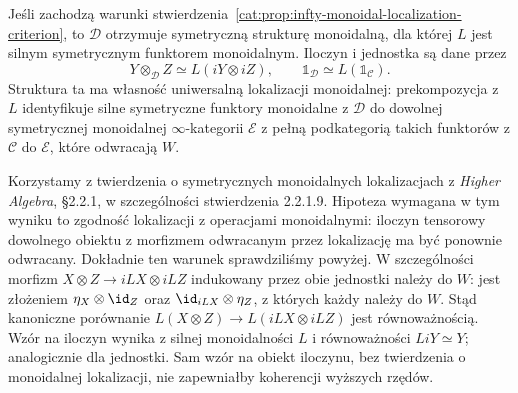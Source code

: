 \begin{twierdzenie}\label{cat:thm:infty-monoidal-localization}
Jeśli zachodzą warunki stwierdzenia~\ref{cat:prop:infty-monoidal-localization-criterion}, to $\mathcal D$ otrzymuje symetryczną strukturę monoidalną, dla której $L$ jest silnym symetrycznym funktorem monoidalnym. Iloczyn i jednostka są dane przez
\[
 Y\otimes_{\mathcal D} Z\simeq L(iY\otimes iZ),
 \qquad \mathbb 1_{\mathcal D}\simeq L(\mathbb 1_{\mathcal C}).
\]
Struktura ta ma własność uniwersalną lokalizacji monoidalnej: prekompozycja z $L$ identyfikuje silne symetryczne funktory monoidalne z $\mathcal D$ do dowolnej symetrycznej monoidalnej $\infty$-kategorii $\mathcal E$ z pełną podkategorią takich funktorów z $\mathcal C$ do $\mathcal E$, które odwracają $W$.
\end{twierdzenie}

Korzystamy z twierdzenia o symetrycznych monoidalnych lokalizacjach z \emph{Higher Algebra}, \S2.2.1, w szczególności stwierdzenia 2.2.1.9. Hipoteza wymagana w tym wyniku to zgodność lokalizacji z operacjami monoidalnymi: iloczyn tensorowy dowolnego obiektu z morfizmem odwracanym przez lokalizację ma być ponownie odwracany. Dokładnie ten warunek sprawdziliśmy powyżej. W szczególności morfizm $X\otimes Z\to iLX\otimes iLZ$ indukowany przez obie jednostki należy do $W$: jest złożeniem $\eta_X\otimes\id_Z$ oraz $\id_{iLX}\otimes\eta_Z$, z których każdy należy do $W$. Stąd kanoniczne porównanie $L(X\otimes Z)\to L(iLX\otimes iLZ)$ jest równoważnością. Wzór na iloczyn wynika z silnej monoidalności $L$ i równoważności $LiY\simeq Y$; analogicznie dla jednostki. Sam wzór na obiekt iloczynu, bez twierdzenia o monoidalnej lokalizacji, nie zapewniałby koherencji wyższych rzędów.


